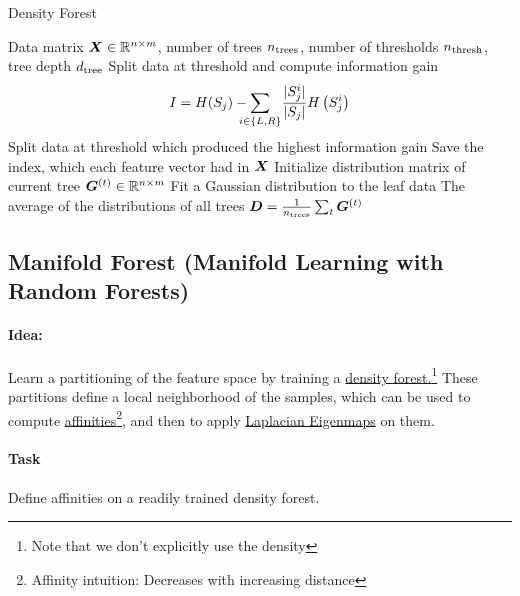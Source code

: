 \begin{algorithm}[H]
\caption{Density Forest}
\begin{algorithmic}
  \REQUIRE Data matrix $\bm{X}\in\mathbb{R}^{n\times m}$, number of trees $n_{\mathrm{trees}}$, number of thresholds $n_{\mathrm{thresh}}$, tree depth $d_{\mathrm{tree}}$
          \STATE Split data at threshold and compute information gain 
            \begin{equation*}
              I = H(S_j) - \sum_{\mathclap{i \in \{L,R\}}}\ \ \frac{|S^i_j|}{|S_j|} H\left(S^i_j\right)
            \end{equation*}
        \ENDFOR
        \STATE Split data at threshold which produced the highest information gain
        \STATE Save the index, which each feature vector had in $\bm{X}$
      \ENDFOR
    \ENDFOR
    \STATE Initialize distribution matrix of current tree $\bm{G}^{(t)}\in\mathbb{R}^{n\times m}$
      \STATE Fit a Gaussian distribution to the leaf data
    \ENDFOR
  \ENDFOR
  \ENSURE The average of the distributions of all trees $\bm{D}=\frac{1}{n_{\mathrm{trees}}}\sum_t\bm{G}^{(t)}$
\end{algorithmic}
\end{algorithm}


\subsection{Manifold Forest (Manifold Learning with Random Forests)}
\paragraph{Idea:} Learn a partitioning of the feature space by training a \underline{density forest.}\footnote{Note that we don't explicitly use the density} These partitions define a local neighborhood of the samples, which can be used to compute \underline{affinities}\footnote{Affinity intuition: Decreases with increasing distance}, and then to apply \eg \underline{Laplacian Eigenmaps} on them.

\paragraph{Task} Define affinities on a readily trained density forest.

